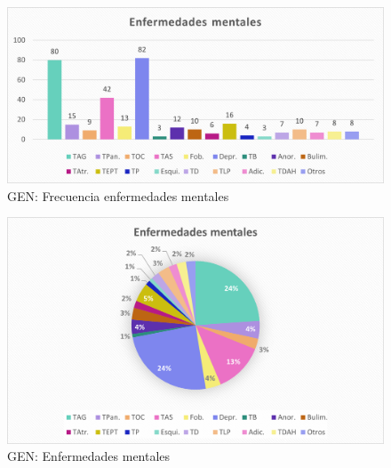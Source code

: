 \documentclass[12pt, a4paper,twoside,titlepage]{book}
\begin{document}
\begin{figure}
    \centering
    \includegraphics[width=.8\linewidth]{ANEXO Gen/23AnexGENEnf}
    \caption{GEN: Frecuencia enfermedades mentales}
    \label{fig:GENFrecenf}
\end{figure}
\begin{figure}
    \centering
    \includegraphics[width=.8\linewidth]{ANEXO Gen/24AnexGENEnf}
    \caption{GEN: Enfermedades mentales}
\end{figure}
\end{document}

